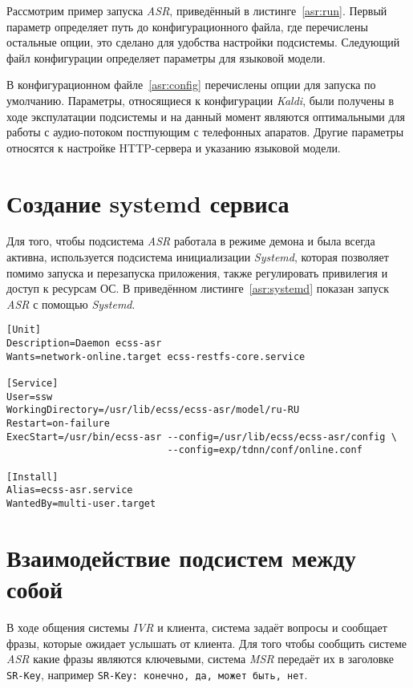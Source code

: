 Рассмотрим пример запуска \textit{ASR}, приведённый в листинге~\ref{asr:run}.
Первый параметр определяет путь до конфигурационного файла, где перечислены
остальные опции, это сделано для удобства настройки подсистемы. Следующий
файл конфигурации определяет параметры для языковой модели.

В конфигурационном файле~\ref{asr:config} перечислены опции для запуска по умолчанию.
Параметры, относящиеся к конфигурации \textit{Kaldi}, были получены в ходе
экспулатации подсистемы и на данный момент являются оптимальными для работы с
аудио-потоком постпующим с телефонных апаратов. Другие параметры относятся к
настройке HTTP-сервера и указанию языковой модели.


\section{Создание systemd сервиса}
Для того, чтобы подсистема \textit{ASR} работала в режиме демона и была всегда
активна, используется подсистема инициализации \textit{Systemd}, которая
позволяет помимо запуска и перезапуска приложения, также регулировать
привилегия и доступ к ресурсам ОС. В приведённом листинге~\ref{asr:systemd}
показан запуск \textit{ASR} с помощью \textit{Systemd}.

\begin{lstlisting}[caption={Содежимое ecss-asr.service},label=asr:systemd]
[Unit]
Description=Daemon ecss-asr
Wants=network-online.target ecss-restfs-core.service

[Service]
User=ssw
WorkingDirectory=/usr/lib/ecss/ecss-asr/model/ru-RU
Restart=on-failure
ExecStart=/usr/bin/ecss-asr --config=/usr/lib/ecss/ecss-asr/config \
                            --config=exp/tdnn/conf/online.conf

[Install]
Alias=ecss-asr.service
WantedBy=multi-user.target

\end{lstlisting}

\section{Взаимодействие подсистем между собой}
В ходе общения системы \textit{IVR} и клиента, система задаёт вопросы и сообщает фразы,
которые ожидает услышать от клиента. Для того чтобы сообщить системе \textit{ASR}
какие фразы являются ключевыми, система \textit{MSR} передаёт их в заголовке \texttt{SR-Key},
например \texttt{SR-Key: конечно, да, может быть, нет}.

